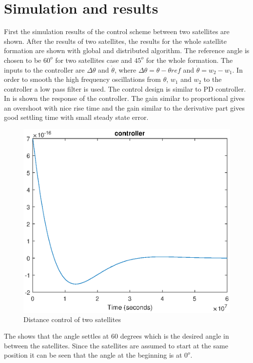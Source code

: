 \section{Simulation and results}
 First the simulation results of the control scheme between two satellites are shown. After the results of two satellites, the results for the whole satellite formation are shown with global and distributed algorithm. The reference angle is chosen to be $60^{o}$ for two satellites case and $45^{o}$ for the whole formation. The inputs to the controller are $\Delta\theta$ and $\dot{\theta}$, where $\Delta\theta = \theta - \theta{ref}$ and $\dot{\theta} = w_2 - w_1$. In order to smooth the high frequency  oscillations from $\theta$, $w_1$ and $w_2$ to the controller a low pass filter is used. The control design is similar to PD controller. In  is shown the response of the controller. The gain similar to proportional gives an overshoot with nice rise time and the gain similar to the derivative part gives good settling time with small steady state error.   
%
\begin{figure}[H]
	\centering
	\includegraphics[width=0.9\linewidth]
	{figures/distance_control_twosat.eps}
	\caption{Distance control of two satellites }
	\label{fig:distancecontrol}
\end{figure}
%
The  shows that the angle settles at 60 degrees which is the desired angle in between the satellites. Since the satellites are assumed to start at the same position it can be seen that the angle at the beginning is at $0^{o}$. 
